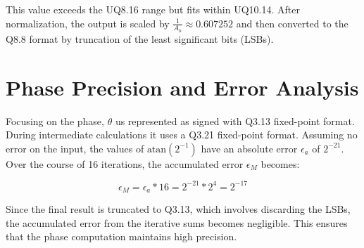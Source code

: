 This value exceeds the UQ8.16 range but fits within UQ10.14. After normalization, the output is scaled by \( \frac{1}{A_n} \approx 0.607252 \) and then converted to the Q8.8 format by truncation of the least significant bits (LSBs).

\section{Phase Precision and Error Analysis}
Focusing on the phase, \( \theta \) us represented as signed with Q3.13 fixed-point format. During intermediate calculations it uses a Q3.21 fixed-point format. Assuming no error on the input, the values of \( \text{atan}(2^{-1}) \) have an absolute error \( \epsilon_a \) of \(2^{-21}\). Over the course of 16 iterations, the accumulated error \( \epsilon_M \) becomes:

\[
    \epsilon_M = \epsilon_a * 16 = 2^{-21} * 2^{4} = 2^{-17}
\]

Since the final result is truncated to Q3.13, which involves discarding the LSBs, the accumulated error from the iterative sums becomes negligible. This ensures that the phase computation maintains high precision.